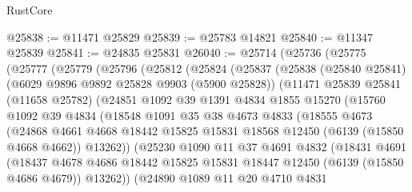 \begin{lexlean}{RustCore}
\begin{coremodule}
@25838 := @11471 @25829
@25839 := @25783 @14821
@25840 := @11347 @25839
@25841 := @24835 @25831
@26040 := @25714
    (@25736
      (@25775
        (@25777
          (@25779
            (@25796
              (@25812
                (@25824
                  (@25837
                    (@25838
                      (@25840 @25841)
                      (@6029 @9896 @9892 @25828 @9903 (@5900 @25828))
                      (@11471
                        @25839
                        @25841
                        (@11658 @25782)
                        (@24851
                          @1092
                          @39
                          @1391
                          @4834
                          @1855
                          @15270
                          (@15760
                            @1092
                            @39
                            @4834
                            (@18548
                              @1091
                              @35
                              @38
                              @4673
                              @4833
                              (@18555
                                @4673
                                (@24868
                                  @4661
                                  @4668
                                  @18442
                                  @15825
                                  @15831
                                  @18568
                                  @12450
                                  (@6139 (@15850 @4668 @4662))
                                  @13262))
                              (@25230
                                @1090
                                @11
                                @37
                                @4691
                                @4832
                                (@18431
                                  @4691
                                  (@18437
                                    @4678
                                    @4686
                                    @18442
                                    @15825
                                    @15831
                                    @18447
                                    @12450
                                    (@6139 (@15850 @4686 @4679))
                                    @13262))
                                (@24890
                                  @1089
                                  @11
                                  @20
                                  @4710
                                  @4831

\end{coremodule}
\end{lexlean}
